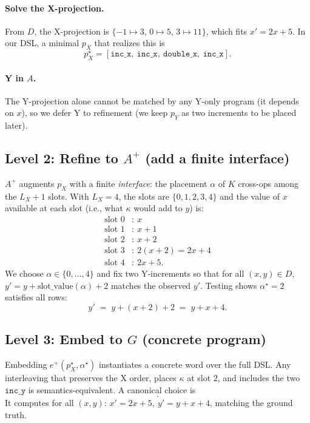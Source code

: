 \documentclass[11pt]{article}
\begin{document}
\paragraph{Solve the X-projection.}
From $D$, the X-projection is $\{-1\!\mapsto\!3,\,0\!\mapsto\!5,\,3\!\mapsto\!11\}$, which fits $x'=2x+5$.
In our DSL, a minimal $p_X$ that realizes this is
\begin{equation*}
p_X^\star=[\texttt{inc\_x},\ \texttt{inc\_x},\ \texttt{double\_x},\ \texttt{inc\_x}].
\end{equation*}
\paragraph{Y in $A$.} The Y-projection alone cannot be matched by any Y-only program (it depends on $x$),
so we defer Y to refinement (we keep $p_Y$ as two increments to be placed later).

\subsection{Level 2: Refine to $A^{+}$ (add a finite interface)}
$A^{+}$ augments $p_X$ with a finite \emph{interface}: the placement $\alpha$ of $K$ cross-ops among the $L_X\!+\!1$ slots.
With $L_X=4$, the slots are $\{0,1,2,3,4\}$ and the value of $x$ available at each slot (i.e., what $\kappa$ would add to $y$) is:
\begin{align*}
\text{slot }0 &:~ x\\
\text{slot }1 &:~ x+1\\
\text{slot }2 &:~ x+2\\
\text{slot }3 &:~ 2(x+2)=2x+4\\
\text{slot }4 &:~ 2x+5.
\end{align*}
We choose $\alpha\in\{0,\dots,4\}$ and fix two Y-increments so that for all $(x,y)\in D$,
\(
y' = y + \text{slot\_value}(\alpha) + 2
\)
matches the observed $y'$. Testing shows $\alpha^\star=2$ satisfies all rows:
\begin{equation*}
y' \;=\; y + (x+2) + 2 \;=\; y + x + 4.
\end{equation*}

\subsection{Level 3: Embed to $G$ (concrete program)}
Embedding $e^{+}(p_X^\star,\alpha^\star)$ instantiates a concrete word over the full DSL.
Any interleaving that preserves the X order, places $\kappa$ at slot $2$, and includes the two $\texttt{inc\_y}$ is semantics-equivalent.
A canonical choice is
\begin{equation*}
[\texttt{inc\_x},\ \texttt{inc\_x},\ \kappa,\ \texttt{double\_x},\ \texttt{inc\_x},\ \texttt{inc\_y},\ \texttt{inc\_y}].
\end{equation*}
It computes for all $(x,y)$:
\(
x'\!=\!2x+5,\ y'\!=\!y+x+4
\),
matching the ground truth.
\end{document}
